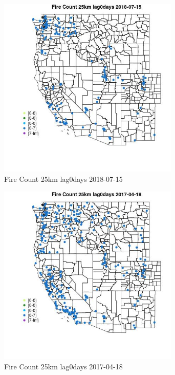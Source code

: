 \begin{figure} 
\centering  
\includegraphics[width=0.77\textwidth]{Code_Outputs/Report_ML_input_PM25_Step4_part_e_de_duplicated_aves_compiled_2019-05-20wNAs_MapObsFire_Count_25km_lag0days2018-07-15.jpg} 
\caption{\label{fig:Report_ML_input_PM25_Step4_part_e_de_duplicated_aves_compiled_2019-05-20wNAsMapObsFire_Count_25km_lag0days2018-07-15}Fire Count 25km lag0days 2018-07-15} 
\end{figure} 
 

\begin{figure} 
\centering  
\includegraphics[width=0.77\textwidth]{Code_Outputs/Report_ML_input_PM25_Step4_part_e_de_duplicated_aves_compiled_2019-05-20wNAs_MapObsFire_Count_25km_lag0days2017-04-18.jpg} 
\caption{\label{fig:Report_ML_input_PM25_Step4_part_e_de_duplicated_aves_compiled_2019-05-20wNAsMapObsFire_Count_25km_lag0days2017-04-18}Fire Count 25km lag0days 2017-04-18} 
\end{figure} 
 

